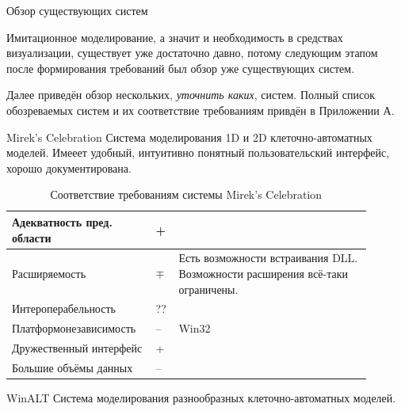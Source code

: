 \documentclass[a4paper,12pt]{extarticle}
\begin{document}
\begin{section}{Обзор существующих систем}

Имитационное моделирование, а значит и необходимость в средствах визуализации, существует уже достаточно давно, потому следующим этапом после формирования требований был обзор уже существующих систем.

Далее приведён обзор нескольких, \textit{уточнить каких}, систем. Полный список обозреваемых систем и их соответствие требованиям привдён в Приложении А. 

\begin{subsection}{Mirek's Celebration}
    Система моделирования 1D и 2D клеточно-автоматных моделей.
    Имееет удобный, интуитивно понятный пользовательский интерфейс, хорошо документирована.

    \begin{table}[h]
        \caption{Соответствие требованиям системы Mirek's Celebration}
        \label{tabular:mirekscell}
        \begin{center}
            \begin{tabular}{|p{0.35\linewidth}|p{0.05\linewidth}|p{0.5\linewidth}|} \hline
                Адекватность пред. области & + & \\ \hline
                Расширяемость              & $\mp$ & Есть возможности встраивания DLL. Возможности расширения всё-таки ограничены. \\ \hline
                Интероперабельность        & ?? & \\ \hline
                Платформонезависимость     & -- & Win32 \\ \hline
                Дружественный интерфейс    & + & \\ \hline
                Большие объёмы данных      & -- & \\ \hline
            \end{tabular}
        \end{center}
    \end{table}
\end{subsection}

\begin{subsection}{WinALT}
    Система моделирования разнообразных клеточно-автоматных моделей.


\end{subsection}
\end{section}
\end{document}

